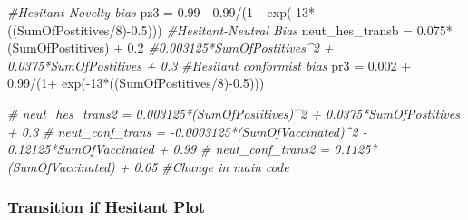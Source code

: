 \documentclass[
]{article}
\newenvironment{Shaded}{\begin{snugshade}}{\end{snugshade}}
\newcommand{\CommentTok}[1]{\textcolor[rgb]{0.56,0.35,0.01}{\textit{#1}}}
\newcommand{\DecValTok}[1]{\textcolor[rgb]{0.00,0.00,0.81}{#1}}
\newcommand{\FloatTok}[1]{\textcolor[rgb]{0.00,0.00,0.81}{#1}}
\newcommand{\FunctionTok}[1]{\textcolor[rgb]{0.00,0.00,0.00}{#1}}
\newcommand{\NormalTok}[1]{#1}
\newcommand{\OtherTok}[1]{\textcolor[rgb]{0.56,0.35,0.01}{#1}}
\newcommand{\SpecialCharTok}[1]{\textcolor[rgb]{0.00,0.00,0.00}{#1}}
\begin{document}
\begin{Shaded}
\begin{Highlighting}[]
\CommentTok{\#Hesitant{-}Novelty bias}
\NormalTok{pz3 }\OtherTok{=} \FloatTok{0.99} \SpecialCharTok{{-}} \FloatTok{0.99}\SpecialCharTok{/}\NormalTok{(}\DecValTok{1}\SpecialCharTok{+} \FunctionTok{exp}\NormalTok{(}\SpecialCharTok{{-}}\DecValTok{13}\SpecialCharTok{*}\NormalTok{((SumOfPostitives}\SpecialCharTok{/}\DecValTok{8}\NormalTok{)}\SpecialCharTok{{-}}\FloatTok{0.5}\NormalTok{)))}
\CommentTok{\#Hesitant{-}Neutral Bias}
\NormalTok{neut\_hes\_transb }\OtherTok{=} \FloatTok{0.075}\SpecialCharTok{*}\NormalTok{(SumOfPostitives) }\SpecialCharTok{+} \FloatTok{0.2}
\CommentTok{\#0.003125*SumOfPostitives\^{}2 + 0.0375*SumOfPostitives + 0.3}
\CommentTok{\#Hesitant conformist bias}
\NormalTok{pr3 }\OtherTok{=} \FloatTok{0.002} \SpecialCharTok{+} \FloatTok{0.99}\SpecialCharTok{/}\NormalTok{(}\DecValTok{1}\SpecialCharTok{+} \FunctionTok{exp}\NormalTok{(}\SpecialCharTok{{-}}\DecValTok{13}\SpecialCharTok{*}\NormalTok{((SumOfPostitives}\SpecialCharTok{/}\DecValTok{8}\NormalTok{)}\SpecialCharTok{{-}}\FloatTok{0.5}\NormalTok{))) }

\CommentTok{\# neut\_hes\_trans2 = 0.003125*(SumOfPostitives)\^{}2 + 0.0375*SumOfPostitives + 0.3}
\CommentTok{\# neut\_conf\_trans = {-}0.0003125*(SumOfVaccinated)\^{}2 {-} 0.12125*SumOfVaccinated + 0.99}
\CommentTok{\# neut\_conf\_trans2 = 0.1125*(SumOfVaccinated) + 0.05 \#Change in main code}
\end{Highlighting}
\end{Shaded}

\hypertarget{transition-if-hesitant-plot}{%
\subsubsection{Transition if Hesitant
Plot}\label{transition-if-hesitant-plot}}
\end{document}
